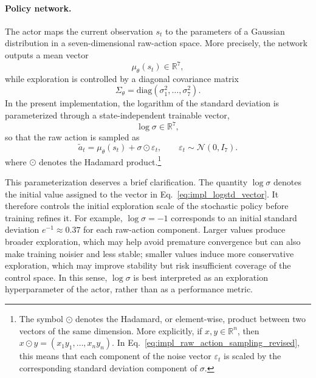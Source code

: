 \paragraph{Policy network.}
The actor maps the current observation \(s_t\) to the parameters of a Gaussian distribution in a seven-dimensional raw-action space. More precisely, the network outputs a mean vector
\begin{equation}
\mu_{\theta}(s_t) \in \mathbb{R}^{7},
\label{eq:impl_policy_mean_revised}
\end{equation}
while exploration is controlled by a diagonal covariance matrix
\begin{equation}
\Sigma_{\theta} = \mathrm{diag}(\sigma_1^2,\dots,\sigma_7^2).
\label{eq:impl_policy_covariance_revised}
\end{equation}
In the present implementation, the logarithm of the standard deviation is parameterized through a state-independent trainable vector,
\begin{equation}
\log \sigma \in \mathbb{R}^{7},
\label{eq:impl_logstd_vector}
\end{equation}
so that the raw action is sampled as
\begin{equation}
\tilde a_t
=
\mu_{\theta}(s_t)
+
\sigma \odot \varepsilon_t,
\qquad
\varepsilon_t \sim \mathcal{N}(0,I_7).
\label{eq:impl_raw_action_sampling_revised}
\end{equation}
where \(\odot\) denotes the Hadamard product.\footnote{The symbol \(\odot\) denotes the Hadamard, or element-wise, product between two vectors of the same dimension. More explicitly, if \(x,y\in\mathbb{R}^n\), then
\(
x\odot y = (x_1 y_1,\dots,x_n y_n).
\)
In Eq.~\eqref{eq:impl_raw_action_sampling_revised}, this means that each component of the noise vector \(\varepsilon_t\) is scaled by the corresponding standard deviation component of \(\sigma\).}


This parameterization deserves a brief clarification. The quantity \(\log \sigma\) denotes the initial value assigned to the vector in Eq.~\eqref{eq:impl_logstd_vector}. It therefore controls the initial exploration scale of the stochastic policy before training refines it. For example, \(\log \sigma = -1\) corresponds to an initial standard deviation \(e^{-1}\approx 0.37\) for each raw-action component. Larger values produce broader exploration, which may help avoid premature convergence but can also make training noisier and less stable; smaller values induce more conservative exploration, which may improve stability but risk insufficient coverage of the control space. In this sense, \(\log \sigma\) is best interpreted as an exploration hyperparameter of the actor, rather than as a performance metric.

